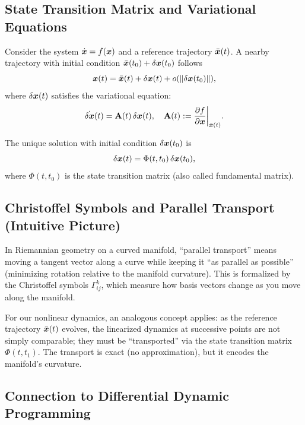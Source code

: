 \subsection{State Transition Matrix and Variational Equations}

Consider the system $\dot{\bm{x}} = f(\bm{x})$ and a reference trajectory $\bar{\bm{x}}(t)$. A nearby trajectory
with initial condition $\bar{\bm{x}}(t_0) + \delta\bm{x}(t_0)$ follows
\begin{equation}
\bm{x}(t) = \bar{\bm{x}}(t) + \delta\bm{x}(t) + o(\left\lVert \delta\bm{x}(t_0) \right\rVert),
\label{eq:ch1:perturbed-traj}
\end{equation}
where $\delta\bm{x}(t)$ satisfies the variational equation:
\begin{equation}
\dot{\delta\bm{x}}(t) = \mathbf{A}(t) \, \delta\bm{x}(t), \quad \mathbf{A}(t) := \frac{\partial f}{\partial \bm{x}}\bigg|_{\bar{\bm{x}}(t)}.
\label{eq:ch1:variational-eq}
\end{equation}

The unique solution with initial condition $\delta\bm{x}(t_0)$ is
\begin{equation}
\delta\bm{x}(t) = \Phi(t, t_0) \, \delta\bm{x}(t_0),
\label{eq:ch1:dx-solution}
\end{equation}
where $\Phi(t, t_0)$ is the state transition matrix (also called fundamental matrix).

\subsection{Christoffel Symbols and Parallel Transport (Intuitive Picture)}

In Riemannian geometry on a curved manifold, ``parallel transport'' means moving a tangent
vector along a curve while keeping it ``as parallel as possible'' (minimizing rotation relative
to the manifold curvature). This is formalized by the Christoffel symbols $\Gamma^k_{ij}$, which
measure how basis vectors change as you move along the manifold.

For our nonlinear dynamics, an analogous concept applies: as the reference trajectory $\bar{\bm{x}}(t)$
evolves, the linearized dynamics at successive points are not simply comparable; they must be
``transported'' via the state transition matrix $\Phi(t, t_1)$. The transport is exact (no
approximation), but it encodes the manifold's curvature.

\subsection{Connection to Differential Dynamic Programming}

